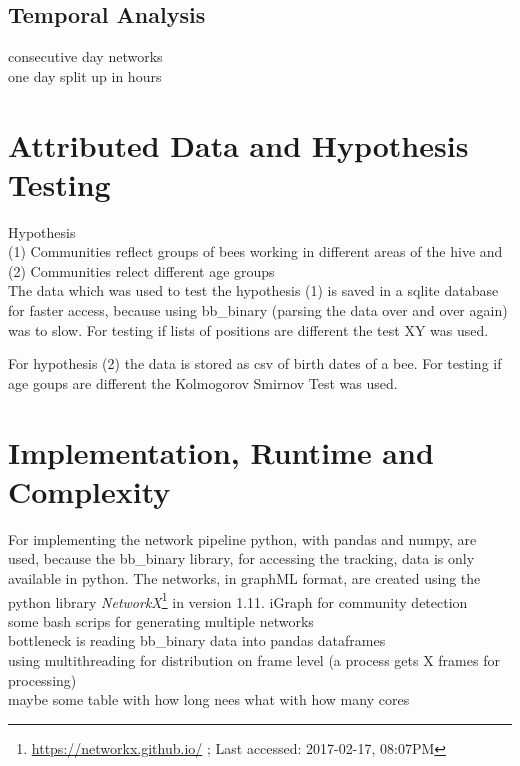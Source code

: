 \subsection{Temporal Analysis}
consecutive day networks\\
one day split up in hours\\

\section{Attributed Data and Hypothesis Testing}
Hypothesis\\
(1) Communities reflect groups of bees working in different areas of the hive and\\ (2) Communities relect different age groups\\

The data which was used to test the hypothesis (1) is saved in a sqlite database for faster access, because using bb\_binary (parsing the data over and over again) was to slow. For testing if lists of positions are different the test XY was used.

For hypothesis (2) the data is stored as csv of birth dates of a bee. For testing if age goups are different the Kolmogorov Smirnov Test was used.

\section{Implementation, Runtime and Complexity}
For implementing the network pipeline python, with pandas and numpy, are used, because the bb\_binary library, for accessing the tracking, data is only available in python. The networks, in graphML format, are created using the python library \emph{NetworkX}\footnote{\url{https://networkx.github.io/} ; Last accessed: 2017-02-17, 08:07PM} in version 1.11.
iGraph for community detection\\
some bash scrips for generating multiple networks\\

bottleneck is reading bb\_binary data into pandas dataframes\\
using multithreading for distribution on frame level (a process gets X frames for processing)\\

maybe some table with how long nees what with how many cores\\

